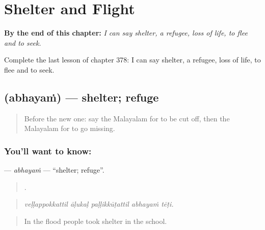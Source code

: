 
\chapter{Shelter and Flight}
\label{ch:ml-shelter-and-flight}

\begin{chapteropening}
\textbf{By the end of this chapter:} \emph{I can say shelter, a refugee, loss of life, to flee and to seek.}

Complete the last lesson of chapter 378: I can say shelter, a refugee, loss of life, to flee and to seek.
\end{chapteropening}

\section[\texorpdfstring{\ml{അഭയം} (abhayaṁ)}{അഭയം (abhayaṁ)}]{ (abhayaṁ) — shelter; refuge}

\label{lesson:ML-C378-abhayam}



\begin{quote}
Before the new one: say the Malayalam for to be cut off, then the Malayalam for to go missing.
\end{quote}

\subsection*{You'll want to know: }
\textbf{} — \emph{abhayaṁ} — \textquotedblleft{}shelter; refuge\textquotedblright{}.

\begin{quote}
    .
\end{quote}

\begin{quote}
\emph{veḷḷappokkattil āḷukaḷ paḷḷikkūṭattil abhayaṁ tēṭi.}
\end{quote}

\begin{quote}
In the flood people took shelter in the school.
\end{quote}

